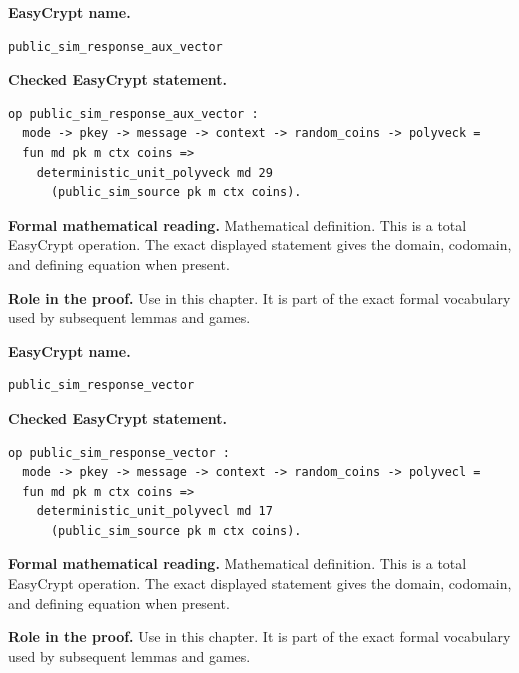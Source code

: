 \begin{formaldefinition}
\noindent\textbf{EasyCrypt name.}
\begin{lstlisting}[language=EasyCrypt,basicstyle=\ttfamily\scriptsize]
public_sim_response_aux_vector
\end{lstlisting}
\noindent\textbf{Checked EasyCrypt statement.}
\begin{lstlisting}[language=EasyCrypt,basicstyle=\ttfamily\scriptsize]
op public_sim_response_aux_vector :
  mode -> pkey -> message -> context -> random_coins -> polyveck =
  fun md pk m ctx coins =>
    deterministic_unit_polyveck md 29
      (public_sim_source pk m ctx coins).
\end{lstlisting}
\noindent\textbf{Formal mathematical reading.}
Mathematical definition. This is a total EasyCrypt operation.  The exact displayed statement gives the domain, codomain, and defining equation when present.

\noindent\textbf{Role in the proof.}
Use in this chapter. It is part of the exact formal vocabulary used by subsequent lemmas and games.

\end{formaldefinition}

\begin{formaldefinition}
\noindent\textbf{EasyCrypt name.}
\begin{lstlisting}[language=EasyCrypt,basicstyle=\ttfamily\scriptsize]
public_sim_response_vector
\end{lstlisting}
\noindent\textbf{Checked EasyCrypt statement.}
\begin{lstlisting}[language=EasyCrypt,basicstyle=\ttfamily\scriptsize]
op public_sim_response_vector :
  mode -> pkey -> message -> context -> random_coins -> polyvecl =
  fun md pk m ctx coins =>
    deterministic_unit_polyvecl md 17
      (public_sim_source pk m ctx coins).
\end{lstlisting}
\noindent\textbf{Formal mathematical reading.}
Mathematical definition. This is a total EasyCrypt operation.  The exact displayed statement gives the domain, codomain, and defining equation when present.

\noindent\textbf{Role in the proof.}
Use in this chapter. It is part of the exact formal vocabulary used by subsequent lemmas and games.

\end{formaldefinition}

